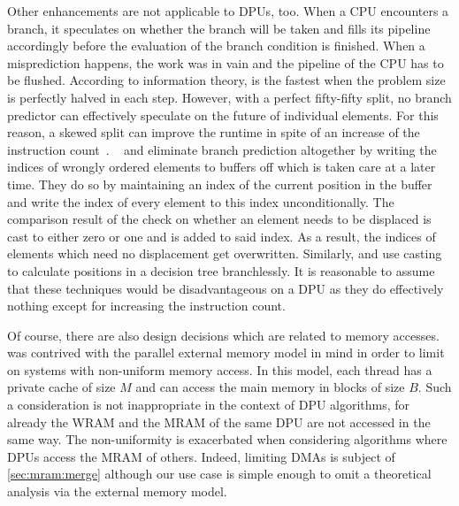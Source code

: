 Other enhancements are not applicable to \acp{DPU}, too.
When a \ac{CPU} encounters a branch, it speculates on whether the branch will be taken and fills its pipeline accordingly before the evaluation of the branch condition is finished.
When a misprediction happens, the work was in vain and the pipeline of the \ac{CPU} has to be flushed.
According to information theory, \QS{} is the fastest when the problem size is perfectly halved in each step.
However, with a perfect fifty-fifty split, no branch predictor can effectively speculate on the future of individual elements.
For this reason, a skewed split can improve the runtime in spite of an increase of the instruction count~\cite{kaligosi2009misprediction}.
\BQS{}~\cite{edelkamp2016misprediction} and \IPSo{} eliminate branch prediction altogether by writing the indices of wrongly ordered elements to buffers off which is taken care at a later time.
They do so by maintaining an index of the current position in the buffer and write the index of every element to this index unconditionally.
The comparison result of the check on whether an element needs to be displaced is cast to either zero or one and is added to said index.
As a result, the indices of elements which need no displacement get overwritten.
Similarly, \IPSo{} and \SSSSS{} use casting to calculate positions in a decision tree branchlessly.
It is reasonable to assume that these techniques would be disadvantageous on a \ac{DPU} as they do effectively nothing except for increasing the instruction count.

Of course, there are also design decisions which are related to memory accesses.
\IPSo{} was contrived with the parallel external memory model in mind in order to limit  on systems with non-uniform memory access.
In this model, each thread has a private cache of size \(M\) and can access the main memory in blocks of size \(B\).
Such a consideration is not inappropriate in the context of \ac{DPU} algorithms, for already the \ac{WRAM} and the \ac{MRAM} of the same \ac{DPU} are not accessed in the same way.
The non-uniformity is exacerbated when considering algorithms where \acp{DPU} access the \ac{MRAM} of others.
Indeed, limiting \acp{DMA} is subject of \cref{sec:mram:merge} although our use case is simple enough to omit a theoretical analysis via the external memory model.
